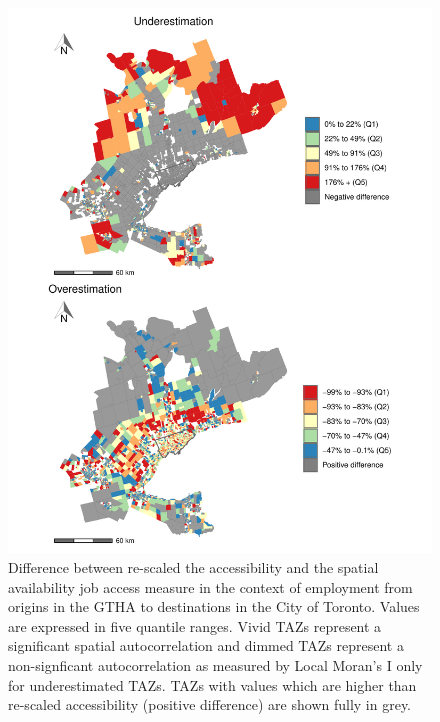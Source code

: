 \documentclass[]{elsarticle} %
\begin{document}
\begin{figure}
\includegraphics[width=1\linewidth]{Spatial-Availability_files/figure-latex/plot-difference-GGH-1} \caption{\label{fig:plot-difference-GGH}Difference between re-scaled the accessibility and the spatial availability job access measure in the context of employment from origins in the GTHA to destinations in the City of Toronto. Values are expressed in five quantile ranges. Vivid TAZs represent a significant spatial autocorrelation and dimmed TAZs represent a non-signficant autocorrelation as measured by Local Moran's I only for underestimated TAZs. TAZs with values which are higher than re-scaled accessibility (positive difference) are shown fully in grey.}\label{fig:plot-difference-GGH}
\end{figure}
\end{document}
